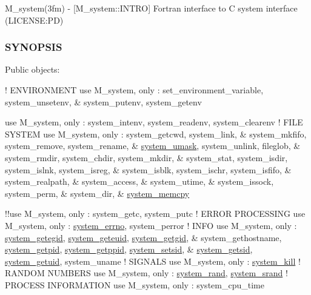 M\+\_\+system(3fm) -\/ \mbox{[}M\+\_\+system\+::\+I\+N\+T\+RO\mbox{]} Fortran interface to C system interface (L\+I\+C\+E\+N\+SE\+:PD) \subsubsection*{S\+Y\+N\+O\+P\+S\+IS}

Public objects\+:

! E\+N\+V\+I\+R\+O\+N\+M\+E\+NT use M\+\_\+system, only \+: set\+\_\+environment\+\_\+variable, system\+\_\+unsetenv, \& system\+\_\+putenv, system\+\_\+getenv

use M\+\_\+system, only \+: system\+\_\+intenv, system\+\_\+readenv, system\+\_\+clearenv ! F\+I\+LE S\+Y\+S\+T\+EM use M\+\_\+system, only \+: system\+\_\+getcwd, system\+\_\+link, \& system\+\_\+mkfifo, system\+\_\+remove, system\+\_\+rename, \& \mbox{\hyperlink{interfacem__system_1_1system__umask}{system\+\_\+umask}}, system\+\_\+unlink, fileglob, \& system\+\_\+rmdir, system\+\_\+chdir, system\+\_\+mkdir, \& system\+\_\+stat, system\+\_\+isdir, system\+\_\+islnk, system\+\_\+isreg, \& system\+\_\+isblk, system\+\_\+ischr, system\+\_\+isfifo, \& system\+\_\+realpath, \& system\+\_\+access, \& system\+\_\+utime, \& system\+\_\+issock, system\+\_\+perm, \& system\+\_\+dir, \& \mbox{\hyperlink{interfacem__system_1_1system__memcpy}{system\+\_\+memcpy}}

!!use M\+\_\+system, only \+: system\+\_\+getc, system\+\_\+putc ! E\+R\+R\+OR P\+R\+O\+C\+E\+S\+S\+I\+NG use M\+\_\+system, only \+: \mbox{\hyperlink{interfacem__system_1_1system__errno}{system\+\_\+errno}}, system\+\_\+perror ! I\+N\+FO use M\+\_\+system, only \+: \mbox{\hyperlink{interfacem__system_1_1system__getegid}{system\+\_\+getegid}}, \mbox{\hyperlink{interfacem__system_1_1system__geteuid}{system\+\_\+geteuid}}, \mbox{\hyperlink{interfacem__system_1_1system__getgid}{system\+\_\+getgid}}, \& system\+\_\+gethostname, \mbox{\hyperlink{interfacem__system_1_1system__getpid}{system\+\_\+getpid}}, \mbox{\hyperlink{interfacem__system_1_1system__getppid}{system\+\_\+getppid}}, \mbox{\hyperlink{interfacem__system_1_1system__setsid}{system\+\_\+setsid}}, \& \mbox{\hyperlink{interfacem__system_1_1system__getsid}{system\+\_\+getsid}}, \mbox{\hyperlink{interfacem__system_1_1system__getuid}{system\+\_\+getuid}}, system\+\_\+uname ! S\+I\+G\+N\+A\+LS use M\+\_\+system, only \+: \mbox{\hyperlink{interfacem__system_1_1system__kill}{system\+\_\+kill}} ! R\+A\+N\+D\+OM N\+U\+M\+B\+E\+RS use M\+\_\+system, only \+: \mbox{\hyperlink{interfacem__system_1_1system__rand}{system\+\_\+rand}}, \mbox{\hyperlink{interfacem__system_1_1system__srand}{system\+\_\+srand}} ! P\+R\+O\+C\+E\+SS I\+N\+F\+O\+R\+M\+A\+T\+I\+ON use M\+\_\+system, only \+: system\+\_\+cpu\+\_\+time


